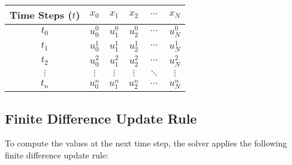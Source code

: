 \documentclass{article}
\begin{document}
		\begin{center}
			\begin{tabular}{|c|c|c|c|c|c|}
				\hline
				\textbf{Time Steps ($t$)} & \textbf{$x_0$} & \textbf{$x_1$} & \textbf{$x_2$} & \textbf{$\cdots$} & \textbf{$x_N$} \\
				\hline
				$t_0$ & $u_0^0$ & $u_1^0$ & $u_2^0$ & $\cdots$ & $u_N^0$ \\
				\hline
				$t_1$ & $u_0^1$ & $u_1^1$ & $u_2^1$ & $\cdots$ & $u_N^1$ \\
				\hline
				$t_2$ & $u_0^2$ & $u_1^2$ & $u_2^2$ & $\cdots$ & $u_N^2$ \\
				\hline
				$\vdots$ & $\vdots$ & $\vdots$ & $\vdots$ & $\ddots$ & $\vdots$ \\
				\hline
				$t_n$ & $u_0^n$ & $u_1^n$ & $u_2^n$ & $\cdots$ & $u_N^n$ \\
				\hline
			\end{tabular}
		\end{center}
		
		\begin{comment}
			
		\textbf{Explanation}:
		\begin{itemize}
			\item \textbf{Each row} represents a distinct time step $t_n$.
			\item \textbf{Each column} represents a specific spatial location $x_i$.
			\item The value $u_i^n$ at each grid point represents the displacement of the wave at spatial point $x_i$ and time step $t_n$.
			\item Using the finite difference scheme, the solver calculates values at each point in the grid based on values from previous steps and adjacent spatial points.
		\end{itemize}
		
		\end{comment}
		
		
		\subsection{Finite Difference Update Rule}
		
		To compute the values at the next time step, the solver applies the following finite difference update rule:
		
\end{document}
